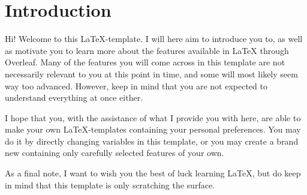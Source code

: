 \section{Introduction}

Hi! 
Welcome to this \LaTeX-template. I will here aim to introduce you to, as well as motivate you to learn more about the features available in LaTeX through Overleaf. Many of the features you will come across in this template are not necessarily relevant to you at this point in time, and some will most likely seem way too advanced. However, keep in mind that you are not expected to understand everything at once either.

I hope that you, with the assistance of what I provide you with here, are able to make your own LaTeX-templates containing your personal preferences. You may do it by directly changing variables in this template, or you may create a brand new containing only carefully selected features of your own. 

As a final note, I want to wish you the best of luck learning LaTeX, but do keep in mind that this template is only scratching the surface.

\nocite{imt_software_wiki}  %
